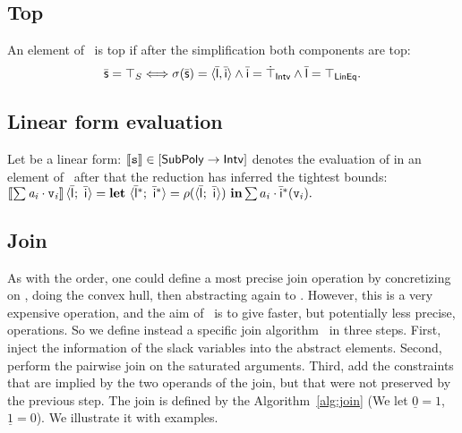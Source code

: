 \documentclass[sttt]{svjour}
\begin{document}
\subsection{Top}
An element of \Subpoly\ is top if after the simplification both components are top:
\[
\bar{\mathsf{\mathsf{s}}} = \top_{S} \Longleftrightarrow \sigma(\bar{\mathsf{\mathsf{s}}}) = \langle \bar{\mathsf{\mathsf{l}}}, \bar{\mathsf{\mathsf{i}}} \rangle \wedge \bar{\mathsf{\mathsf{i}}} = \dot\top_{\mathsf{Intv}} \wedge \bar{\mathsf{\mathsf{l}}} = \top_{\mathsf{LinEq}}.
\]

\subsection{Linear form evaluation}
Let  be a linear form: $\llbracket \mathtt{s} \rrbracket\in [\mathsf{SubPoly} \rightarrow\mathsf{Intv}]$ denotes the evaluation of  in an element of \Subpoly\ after that the reduction has inferred the tightest bounds: 
\(
\left\sx\sum \mathit{a_i} \cdot \var_\mathit{i} \right\dx\subpolyPair{}{} = \mathbf{let}\ \subpolyPair{}{*} = \rho(\subpolyPair{}{})\ \mathbf{in} \sum a_i \cdot \ael{i}^*(\var_i). 
\)



\subsection{Join}
As with the order, one could define a most precise join operation by concretizing on \Polyhedra{}, doing the convex hull, then abstracting again to \Subpoly.
However, this is a very expensive operation, and the aim of \Subpoly\ is to give faster, but potentially less precise, operations.
So we define instead a specific join algorithm \joinS\ in three steps.
First,  inject the information of the slack variables into the abstract elements.
Second,  perform the  pairwise join  on the saturated arguments. 
Third, add the constraints that are implied by the two operands of the join, but that were not preserved by the previous step.
The join is defined by the Algorithm~\ref{alg:join} 
(We let $\underline{0} = 1$, $\underline{1} = 0$).
We illustrate it with examples.
\end{document}
